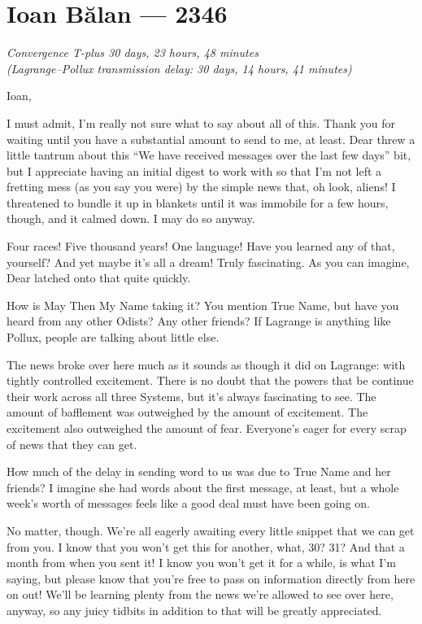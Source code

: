 \hypertarget{ioan-bux103lan-2346}{%
\chapter{Ioan Bălan — 2346}}

\begin{center}
\emph{Convergence T-plus 30 days, 23 hours, 48 minutes}\\
\emph{(Lagrange--Pollux transmission delay: 30 days, 14 hours, 41 minutes)}
\end{center}

\noindent Ioan,

I must admit, I'm really not sure what to say about all of this. Thank you for waiting until you have a substantial amount to send to me, at least. Dear threw a little tantrum about this ``We have received messages over the last few days'' bit, but I appreciate having an initial digest to work with so that I'm not left a fretting mess (as you say you were) by the simple news that, oh look, aliens! I threatened to bundle it up in blankets until it was immobile for a few hours, though, and it calmed down. I may do so anyway.

Four races! Five thousand years! One language! Have you learned any of that, yourself? And yet maybe it's all a dream! Truly fascinating. As you can imagine, Dear latched onto that quite quickly.
 
How is May Then My Name taking it? You mention True Name, but have you heard from any other Odists? Any other friends? If Lagrange is anything like Pollux, people are talking about little else.

The news broke over here much as it sounds as though it did on Lagrange: with tightly controlled excitement. There is no doubt that the powers that be continue their work across all three Systems, but it's always fascinating to see. The amount of bafflement was outweighed by the amount of excitement. The excitement also outweighed the amount of fear. Everyone's eager for every scrap of news that they can get.

How much of the delay in sending word to us was due to True Name and her friends? I imagine she had words about the first message, at least, but a whole week's worth of messages feels like a good deal must have been going on.

No matter, though. We're all eagerly awaiting every little snippet that we can get from you. I know that you won't get this for another, what, 30? 31? And that a month from when you sent it! I know you won't get it for a while, is what I'm saying, but please know that you're free to pass on information directly from here on out! We'll be learning plenty from the news we're allowed to see over here, anyway, so any juicy tidbits in addition to that will be greatly appreciated.

